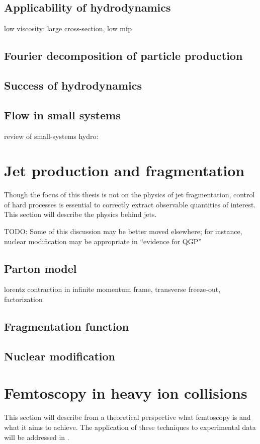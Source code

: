 \subsection{Applicability of hydrodynamics}
low viscosity: large cross-section, low mfp
\subsection{Fourier decomposition of particle production}
\subsection{Success of hydrodynamics}
\subsection{Flow in small systems}
 review of small-systems hydro: \cite{Nagle:2018nvi}

\section{Jet production and fragmentation}
Though the focus of this thesis is not on the physics of jet fragmentation, control of hard processes is essential to correctly extract observable quantities of interest.
This section will describe the physics behind jets.

TODO: Some of this discussion may be better moved elsewhere; for instance, nuclear modification may be appropriate in ``evidence for QGP''
\subsection{Parton model}
lorentz contraction in infinite momentum frame, transverse freeze-out, factorization
\subsection{Fragmentation function}
\subsection{Nuclear modification}


\section{Femtoscopy in heavy ion collisions}
This section will describe from a theoretical perspective what femtoscopy is and what it aims to achieve. The application of these techniques to experimental data will be addressed in .
